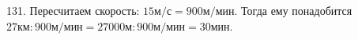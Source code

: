 131. Пересчитаем скорость: $15\text{м}/\text{с}=900\text{м}/\text{мин}.$ Тогда ему понадобится $27\text{км}:900\text{м}/\text{мин}=
27000\text{м}:900\text{м}/\text{мин}=30$мин.\\
